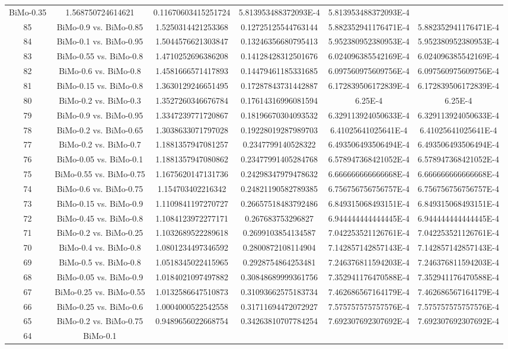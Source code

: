 \documentclass[a4paper,10pt]{article}
\begin{document}
\begin{landscape}
\begin{table}[!htp]
\begin{tabular}{cccccc}
BiMo-0.35&1.568750724614621&0.11670603415251724&5.813953488372093E-4&5.813953488372093E-4\\85&BiMo-0.9 vs. BiMo-0.85&1.5250314421253368&0.12725125544763144&5.882352941176471E-4&5.882352941176471E-4\\84&BiMo-0.1 vs. BiMo-0.95&1.5044576621303847&0.13246356680795413&5.952380952380953E-4&5.952380952380953E-4\\83&BiMo-0.55 vs. BiMo-0.8&1.4710252696386208&0.14128428312501676&6.024096385542169E-4&6.024096385542169E-4\\82&BiMo-0.6 vs. BiMo-0.8&1.4581666571417893&0.14479461185331685&6.097560975609756E-4&6.097560975609756E-4\\81&BiMo-0.15 vs. BiMo-0.8&1.3630129246651495&0.17287843731442887&6.172839506172839E-4&6.172839506172839E-4\\80&BiMo-0.2 vs. BiMo-0.3&1.3527260346676784&0.17614316996081594&6.25E-4&6.25E-4\\79&BiMo-0.9 vs. BiMo-0.95&1.3347239771720867&0.18196670304093532&6.329113924050633E-4&6.329113924050633E-4\\78&BiMo-0.2 vs. BiMo-0.65&1.3038633071797028&0.19228019287989703&6.41025641025641E-4&6.41025641025641E-4\\77&BiMo-0.2 vs. BiMo-0.7&1.1881357947081257&0.2347799140528322&6.493506493506494E-4&6.493506493506494E-4\\76&BiMo-0.05 vs. BiMo-0.1&1.1881357947080862&0.23477991405284768&6.578947368421052E-4&6.578947368421052E-4\\75&BiMo-0.55 vs. BiMo-0.75&1.1675620147131736&0.24298347979478632&6.666666666666668E-4&6.666666666666668E-4\\74&BiMo-0.6 vs. BiMo-0.75&1.154703402216342&0.24821190582789385&6.756756756756757E-4&6.756756756756757E-4\\73&BiMo-0.15 vs. BiMo-0.9&1.1109841197270727&0.26657518483792486&6.849315068493151E-4&6.849315068493151E-4\\72&BiMo-0.45 vs. BiMo-0.8&1.1084123972277171&0.267683753296827&6.944444444444445E-4&6.944444444444445E-4\\71&BiMo-0.2 vs. BiMo-0.25&1.1032689522289618&0.2699103854134587&7.042253521126761E-4&7.042253521126761E-4\\70&BiMo-0.4 vs. BiMo-0.8&1.0801234497346592&0.2800872108114904&7.142857142857143E-4&7.142857142857143E-4\\69&BiMo-0.5 vs. BiMo-0.8&1.0518345022415965&0.2928754864253481&7.246376811594203E-4&7.246376811594203E-4\\68&BiMo-0.05 vs. BiMo-0.9&1.0184021097497882&0.30848689999361756&7.352941176470588E-4&7.352941176470588E-4\\67&BiMo-0.25 vs. BiMo-0.55&1.0132586647510873&0.31093662575183734&7.462686567164179E-4&7.462686567164179E-4\\66&BiMo-0.25 vs. BiMo-0.6&1.0004000522542558&0.31711694472072927&7.575757575757576E-4&7.575757575757576E-4\\65&BiMo-0.2 vs. BiMo-0.75&0.9489656022668754&0.34263810707784254&7.692307692307692E-4&7.692307692307692E-4\\64&BiMo-0.1 
\end{tabular}
\end{table}
\end{landscape}
\end{document}
